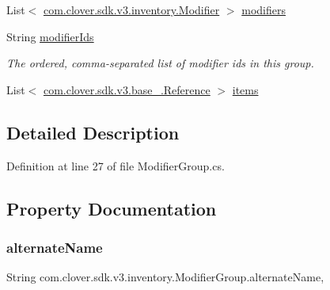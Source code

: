 \begin{DoxyCompactItemize}
List$<$ \hyperlink{classcom_1_1clover_1_1sdk_1_1v3_1_1inventory_1_1_modifier}{com.\+clover.\+sdk.\+v3.\+inventory.\+Modifier} $>$ \hyperlink{classcom_1_1clover_1_1sdk_1_1v3_1_1inventory_1_1_modifier_group_a4e50a07d183b7096a1850aa66c38339b}{modifiers}
\item 
String \hyperlink{classcom_1_1clover_1_1sdk_1_1v3_1_1inventory_1_1_modifier_group_a8628bb1e33bfda65744465bd8c6b6ed7}{modifier\+Ids}
\begin{DoxyCompactList}\small\item\em The ordered, comma-\/separated list of modifier ids in this group. \end{DoxyCompactList}\item 
List$<$ \hyperlink{classcom_1_1clover_1_1sdk_1_1v3_1_1base___1_1_reference}{com.\+clover.\+sdk.\+v3.\+base\+\_\+.\+Reference} $>$ \hyperlink{classcom_1_1clover_1_1sdk_1_1v3_1_1inventory_1_1_modifier_group_acb1ebf24ac3645c1988e62e3d5924b61}{items}
\end{DoxyCompactItemize}


\subsection{Detailed Description}


Definition at line 27 of file Modifier\+Group.\+cs.



\subsection{Property Documentation}
\mbox{\label{classcom_1_1clover_1_1sdk_1_1v3_1_1inventory_1_1_modifier_group_aba0d799002ca5989e4e3f2e399ed2ac0}} 
\subsubsection{\texorpdfstring{alternate\+Name}{alternateName}}
{\footnotesize\ttfamily String com.\+clover.\+sdk.\+v3.\+inventory.\+Modifier\+Group.\+alternate\+Name\hspace{0.3cm}{\ttfamily [get]}, {\ttfamily [set]}}



